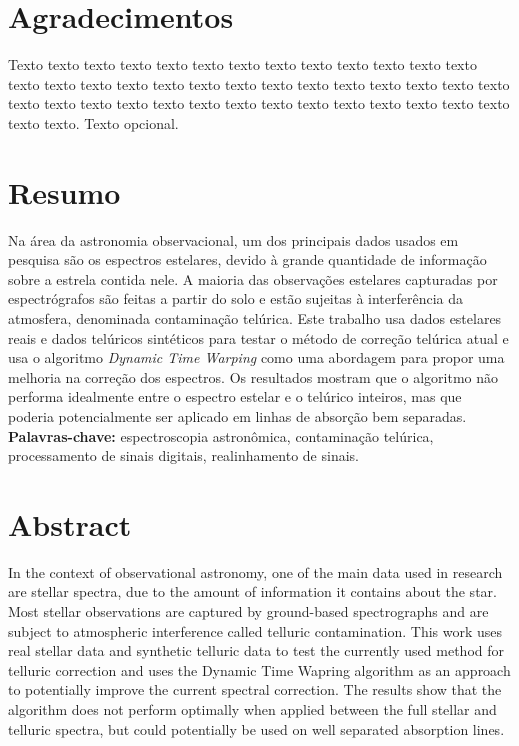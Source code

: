 \documentclass[12pt,twoside,a4paper]{book}
\begin{document}



\chapter*{Agradecimentos}
Texto texto texto texto texto texto texto texto texto texto texto texto texto
texto texto texto texto texto texto texto texto texto texto texto texto texto
texto texto texto texto texto texto texto texto texto texto texto texto texto
texto texto texto texto. Texto opcional.



\chapter*{Resumo}

Na área da astronomia observacional, um dos principais dados usados em pesquisa são os espectros estelares, devido à grande quantidade de informação sobre a estrela contida nele. A maioria das observações estelares capturadas por espectrógrafos são feitas a partir do solo e estão sujeitas à interferência da atmosfera, denominada contaminação telúrica. Este trabalho usa dados estelares reais e dados telúricos sintéticos para testar o método de correção telúrica atual e usa o algoritmo \textit{Dynamic Time Warping} como uma abordagem para propor uma melhoria na correção dos espectros. Os resultados mostram que o algoritmo não performa idealmente entre o espectro estelar e o telúrico inteiros, mas que poderia potencialmente ser aplicado em linhas de absorção bem separadas.
\\

\noindent \textbf{Palavras-chave:} espectroscopia astronômica, contaminação telúrica, processamento de sinais digitais, realinhamento de sinais.

\chapter*{Abstract}

In the context of observational astronomy, one of the main data used in research are stellar spectra, due to the amount of information it contains about the star. Most stellar observations are captured by ground-based spectrographs and are subject to atmospheric interference called telluric contamination. This work uses real stellar data and synthetic telluric data to test the currently used method for telluric correction and uses the Dynamic Time Wapring algorithm as an approach to potentially improve the current spectral correction. The results show that the algorithm does not perform optimally when applied between the full stellar and telluric spectra, but could potentially be used on well separated absorption lines.  
\\
\end{document}
